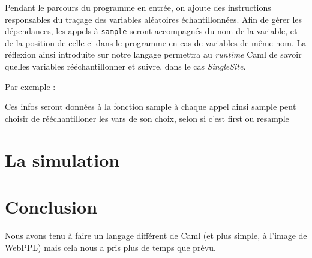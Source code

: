 \documentclass[svgnames]{article}
\begin{document}
Pendant le parcours du programme en entrée, on ajoute des instructions responsables du traçage des variables aléatoires échantillonnées.
Afin de gérer les dépendances, les appels à \lstinline{sample} seront accompagnés du nom de la variable, et de la position de celle-ci dans le programme en cas de variables de même nom. La réflexion ainsi introduite sur notre langage permettra au \emph{runtime} Caml de savoir quelles variables rééchantillonner et suivre, dans le cas \emph{SingleSite}.

Par exemple :


Ces infos seront données à la fonction sample à chaque appel
ainsi sample peut choisir de rééchantilloner les vars de son choix, selon si c'est first ou resample

\section{La simulation}

 

\section{Conclusion}
 

Nous avons tenu à faire un langage différent de Caml (et plus simple, à l'image de WebPPL) mais cela nous a pris plus de temps que prévu.
\end{document}
